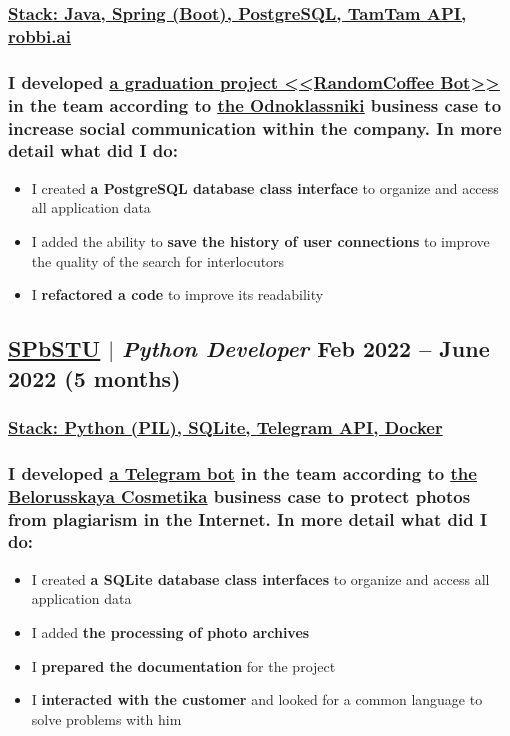 \documentclass[11pt]{article}
\begin{document}
\subsubsection{\underline{\textbf{Stack}: Java, Spring (Boot), PostgreSQL, TamTam API, \href{https://robbi.ai/}{robbi.ai}}}
\subsubsection{I developed \href{https://github.com/Sanerins/tamtam-one-coffee-bot}{\underline{a graduation project <<RandomCoffee Bot>>}} in the team according to \href{https://ok.ru/}{\underline{the Odnoklassniki}} business case to increase social communication within the company. In more detail what did I do:}
\begin{itemize}
    \item I created \textbf{a PostgreSQL database class interface} to organize and access all application data
    \item I added the ability to \textbf{save the history of user connections} to improve the quality of the search for interlocutors
    \item I \textbf{refactored a code} to improve its readability
\end{itemize}

\subsection{\href{https://www.spbstu.ru/}{\underline{SPbSTU}} $|$ {\normalfont\textit{Python Developer}} \hfill Feb 2022 -- June 2022 (5 months)}
\subsubsection{\underline{\textbf{Stack}: Python (PIL), SQLite,  \href{https://github.com/python-telegram-bot/python-telegram-bot}{Telegram API}, Docker}}
\subsubsection{I developed \href{https://github.com/PaaavelZ/FPA-pybot}{\underline{a Telegram bot}} in the team according to \href{https://www.wbc-c.ru/}{\underline{the Belorusskaya Cosmetika}} business case to protect photos from plagiarism in the Internet. In more detail what did I do:}
\begin{itemize}
    \item I created \textbf{a SQLite database class interfaces} to organize and access all application data
    \item I added \textbf{the processing of photo archives}
    \item I \textbf{prepared the documentation} for the project
    \item I \textbf{interacted with the customer} and looked for a common language to solve problems with him
\end{itemize}
\end{document}
